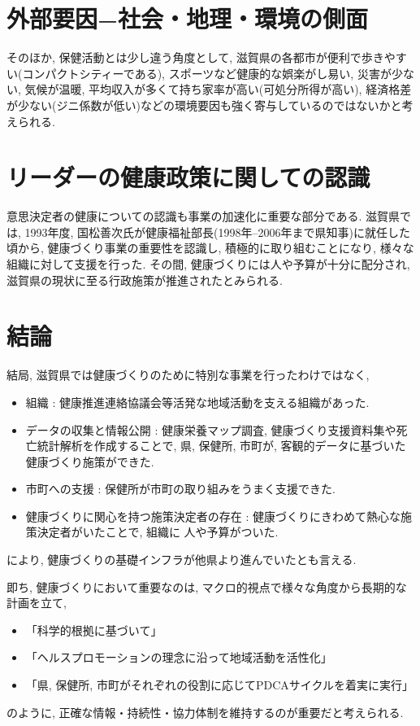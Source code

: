 \section{外部要因−社会・地理・環境の側面}

そのほか, 保健活動とは少し違う角度として, 滋賀県の各都市が便利で歩きやすい(コンパクトシティーである), スポーツなど健康的な娯楽がし易い, 災害が少ない, 気候が温暖, 平均収入が多くて持ち家率が高い(可処分所得が高い), 経済格差が少ない(ジニ係数が低い)などの環境要因も強く寄与しているのではないかと考えられる.


\section{リーダーの健康政策に関しての認識}
意思決定者の健康についての認識も事業の加速化に重要な部分である.
滋賀県では, 1993年度, 国松善次氏が健康福祉部長(1998年--2006年まで県知事)に就任した頃から,
健康づくり事業の重要性を認識し, 積極的に取り組むことになり, 様々な組織に対して支援を行った.
その間, 健康づくりには人や予算が十分に配分され, 滋賀県の現状に至る行政施策が推進されたとみられる.

\section{結論}
結局, 滋賀県では健康づくりのために特別な事業を行ったわけではなく,
\begin{itemize} \setlength{\itemsep}{-0.5mm} \setlength{\parskip}{-0.5mm}
	\item 組織 :  健康推進連絡協議会等活発な地域活動を支える組織があった.
	\item データの収集と情報公開 : 健康栄養マップ調査, 健康づくり支援資料集や死亡統計解析を作成することで, 県, 保健所, 市町が, 客観的データに基づいた健康づくり施策ができた.
	\item 市町への支援 : 保健所が市町の取り組みをうまく支援できた.
	\item 健康づくりに関心を持つ施策決定者の存在 : 健康づくりにきわめて熱心な施策決定者がいたことで, 組織に 人や予算がついた.
\end{itemize}
により, 健康づくりの基礎インフラが他県より進んでいたとも言える.

即ち, 健康づくりにおいて重要なのは, マクロ的視点で様々な角度から長期的な計画を立て,
\begin{itemize} \setlength{\itemsep}{-0.5mm} \setlength{\parskip}{-0.5mm}
	\item 「科学的根拠に基づいて」
	\item 「ヘルスプロモーションの理念に沿って地域活動を活性化」
	\item 「県, 保健所, 市町がそれぞれの役割に応じてPDCAサイクルを着実に実行」
\end{itemize}
のように, 正確な情報・持続性・協力体制を維持するのが重要だと考えられる.


